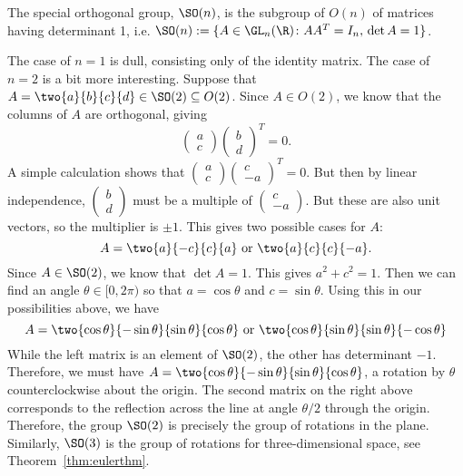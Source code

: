 \begin{dfn}
The special orthogonal group, $\SO(n)$, is the subgroup of $O(n)$ of matrices having determinant 1, i.e. $\SO(n):= \{ A \in \GL_n(\R) \colon AA^T=I_n,\, \det A=1\}$. 
\end{dfn}


\begin{ex} \label{ex:so2}
The case of $n=1$ is dull, consisting only of the identity matrix. The case of $n=2$ is a bit more interesting. Suppose that $A= \two{a}{b}{c}{d} \in \SO(2) \subseteq O(2)$. Since $A \in O(2)$, we know that the columns of $A$ are orthogonal, giving
	\[
	\begin{pmatrix} a \\ c \end{pmatrix} \begin{pmatrix} b \\ d \end{pmatrix}^T=0.
	\]
A simple calculation shows that $\begin{pmatrix} a \\ c \end{pmatrix} \begin{pmatrix} c \\ -a \end{pmatrix}^T=0$. But then by linear independence, $\begin{pmatrix} b \\ d \end{pmatrix}$ must be a multiple of $\begin{pmatrix} c \\ -a \end{pmatrix}$. But these are also unit vectors, so the multiplier is $\pm 1$. This gives two possible cases for $A$: 
	\[
	A=\two{a}{-c}{c}{a} \text{ or } \two{a}{c}{c}{-a}.
	\]
Since $A \in \SO(2)$, we know that $\det A=1$. This gives $a^2+c^2=1$. Then we can find an angle $\theta \in [0,2\pi)$ so that $a= \cos \theta$ and $c= \sin \theta$. Using this in our possibilities above, we have
	\[
	A=\two{\cos\theta}{-\sin\theta}{\sin\theta}{\cos\theta} \text{ or } \two{\cos\theta}{\sin\theta}{\sin\theta}{-\cos\theta}
	\]
While the left matrix is an element of $\SO(2)$, the other has determinant $-1$. Therefore, we must have $A= \two{\cos\theta}{-\sin\theta}{\sin\theta}{\cos\theta}$, a rotation by $\theta$ counterclockwise about the origin. The second matrix on the right above corresponds to the reflection across the line at angle $\theta/2$ through the origin. Therefore, the group $\SO(2)$ is precisely the group of rotations in the plane. Similarly, $\SO(3)$ is the group of rotations for three-dimensional space, see Theorem~\ref{thm:eulerthm}. \xqed
\end{ex}


